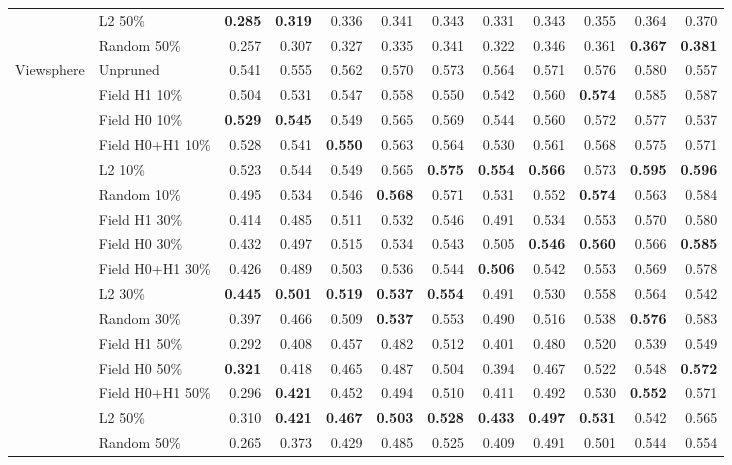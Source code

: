 \begin{tabular}{llrrrrrrrrrr}
 & L2 50\% & \textbf{0.285} & \textbf{0.319} & 0.336 & 0.341 & 0.343 & 0.331 & 0.343 & 0.355 & 0.364 & 0.370 \\
 & Random 50\% & 0.257 & 0.307 & 0.327 & 0.335 & 0.341 & 0.322 & 0.346 & 0.361 & \textbf{0.367} & \textbf{0.381} \\
\midrule
Viewsphere & Unpruned & 0.541 & 0.555 & 0.562 & 0.570 & 0.573 & 0.564 & 0.571 & 0.576 & 0.580 & 0.557 \\
 & Field H1 10\% & 0.504 & 0.531 & 0.547 & 0.558 & 0.550 & 0.542 & 0.560 & \textbf{0.574} & 0.585 & 0.587 \\
 & Field H0 10\% & \textbf{0.529} & \textbf{0.545} & 0.549 & 0.565 & 0.569 & 0.544 & 0.560 & 0.572 & 0.577 & 0.537 \\
 & Field H0+H1 10\% & 0.528 & 0.541 & \textbf{0.550} & 0.563 & 0.564 & 0.530 & 0.561 & 0.568 & 0.575 & 0.571 \\
 & L2 10\% & 0.523 & 0.544 & 0.549 & 0.565 & \textbf{0.575} & \textbf{0.554} & \textbf{0.566} & 0.573 & \textbf{0.595} & \textbf{0.596} \\
 & Random 10\% & 0.495 & 0.534 & 0.546 & \textbf{0.568} & 0.571 & 0.531 & 0.552 & \textbf{0.574} & 0.563 & 0.584 \\
\addlinespace[2pt]
 & Field H1 30\% & 0.414 & 0.485 & 0.511 & 0.532 & 0.546 & 0.491 & 0.534 & 0.553 & 0.570 & 0.580 \\
 & Field H0 30\% & 0.432 & 0.497 & 0.515 & 0.534 & 0.543 & 0.505 & \textbf{0.546} & \textbf{0.560} & 0.566 & \textbf{0.585} \\
 & Field H0+H1 30\% & 0.426 & 0.489 & 0.503 & 0.536 & 0.544 & \textbf{0.506} & 0.542 & 0.553 & 0.569 & 0.578 \\
 & L2 30\% & \textbf{0.445} & \textbf{0.501} & \textbf{0.519} & \textbf{0.537} & \textbf{0.554} & 0.491 & 0.530 & 0.558 & 0.564 & 0.542 \\
 & Random 30\% & 0.397 & 0.466 & 0.509 & \textbf{0.537} & 0.553 & 0.490 & 0.516 & 0.538 & \textbf{0.576} & 0.583 \\
\addlinespace[2pt]
 & Field H1 50\% & 0.292 & 0.408 & 0.457 & 0.482 & 0.512 & 0.401 & 0.480 & 0.520 & 0.539 & 0.549 \\
 & Field H0 50\% & \textbf{0.321} & 0.418 & 0.465 & 0.487 & 0.504 & 0.394 & 0.467 & 0.522 & 0.548 & \textbf{0.572} \\
 & Field H0+H1 50\% & 0.296 & \textbf{0.421} & 0.452 & 0.494 & 0.510 & 0.411 & 0.492 & 0.530 & \textbf{0.552} & 0.571 \\
 & L2 50\% & 0.310 & \textbf{0.421} & \textbf{0.467} & \textbf{0.503} & \textbf{0.528} & \textbf{0.433} & \textbf{0.497} & \textbf{0.531} & 0.542 & 0.565 \\
 & Random 50\% & 0.265 & 0.373 & 0.429 & 0.485 & 0.525 & 0.409 & 0.491 & 0.501 & 0.544 & 0.554 \\
\bottomrule
\end{tabular}
